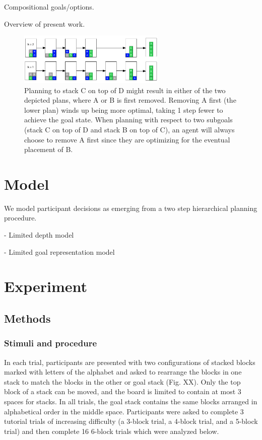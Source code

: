 \documentclass[10pt,letterpaper]{article}
\begin{document}
Compositional goals/options.

Overview of present work.

\begin{figure}[ht]
    \centering
    \includegraphics[width=7cm]{example-4-block}
    \caption{Planning to stack C on top of D might result in either of the two depicted plans, where A or B is first removed. Removing A first (the lower plan) winds up being more optimal, taking 1 step fewer to achieve the goal state. When planning with respect to two subgoals (stack C on top of D and stack B on top of C), an agent will always choose to remove A first since they are optimizing for the eventual placement of B.}
\end{figure}



\section{Model}
We model participant decisions as emerging from a two step hierarchical planning procedure. 

- Limited depth model

- Limited goal representation model



\section{Experiment}

\subsection{Methods}
\subsubsection{Stimuli and procedure}

In each trial, participants are presented with two configurations of stacked blocks marked with letters of the alphabet and asked to rearrange the blocks in one stack to match the blocks in the other or goal stack (Fig. XX). Only the top block of a stack can be moved, and the board is limited to contain at most 3 spaces for stacks. In all trials, the goal stack contains the same blocks arranged in alphabetical order in the middle space. Participants were asked to complete 3 tutorial trials of increasing difficulty (a 3-block trial, a 4-block trial, and a 5-block trial) and then complete 16 6-block trials which were analyzed below.
\end{document}

